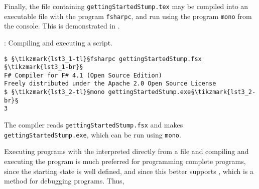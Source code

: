 \documentclass[springer.tex]{subfiles}
\begin{document}
Finally, the file containing \lstinline[language=console]{gettingStartedStump.tex} may be compiled into an executable file with the program \lstinline[language=console]{fsharpc}, and run using the program \lstinline[language=console]{mono} from the console. This is demonstrated in .
%
\begin{codeNOutput}[label=compiler,
  top=-5pt,
  bottom=-5pt,
  left=-2pt,
  right=-2pt,
]{: Compiling and executing a script.}
\begin{lstlisting}[language=console,escapechar=§]
$ §\tikzmark{lst3_1-tl}§fsharpc gettingStartedStump.fsx §\tikzmark{lst3_1-br}§
F# Compiler for F# 4.1 (Open Source Edition)
Freely distributed under the Apache 2.0 Open Source License
$ §\tikzmark{lst3_2-tl}§mono gettingStartedStump.exe§\tikzmark{lst3_2-br}§
3
\end{lstlisting}
\end{codeNOutput}
%
%
%
The compiler reads \lstinline[language=console]{gettingStartedStump.fsx} and makes \lstinline[language=console]{gettingStartedStump.exe}, which can be run using \lstinline[language=console]{mono}.



Executing programs with the interpreted directly from a file and compiling and executing the program is much preferred for programming complete programs, since the starting state is well defined, and since this better supports , which is a method for debugging programs. Thus, %
\end{document}
